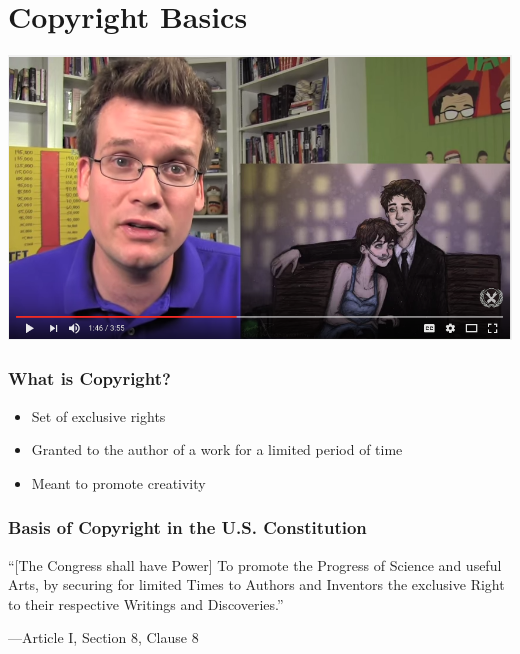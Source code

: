 \section{Copyright Basics}

\begin{frame}
  \centering
  \href{https://www.youtube.com/watch?v=tHp3c9ziIq0}{\includegraphics[scale=0.3]{images/john-green-tumblr-copyright-posters}}
\end{frame}

\begin{frame}
  \frametitle{What is Copyright?}

  \begin{itemize}
    \item Set of exclusive rights
    \item Granted to the author of a work for a limited period of time
    \item Meant to promote creativity
  \end{itemize}
\end{frame}

\begin{frame}
  \frametitle{Basis of Copyright in the U.S. Constitution}

  ``[The Congress shall have Power] To promote the Progress of Science and useful
  Arts, by securing for limited Times to Authors and Inventors the exclusive
  Right to their respective Writings and Discoveries.''

  \begin{flushright}
    ---Article I, Section 8, Clause 8
  \end{flushright}
\end{frame}

